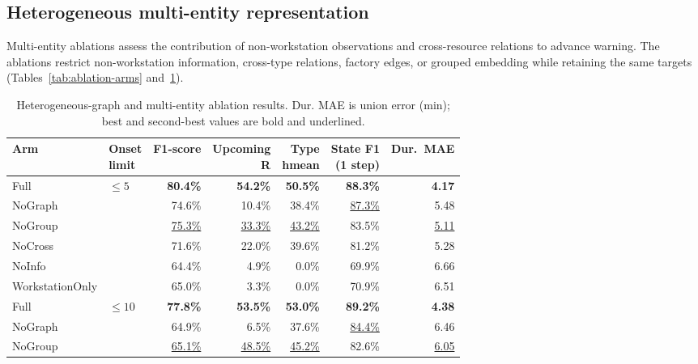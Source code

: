 \subsection{Heterogeneous multi-entity representation}\label{sec:entity-analysis}

Multi-entity ablations assess the contribution of non-workstation observations and cross-resource relations to advance warning. The ablations restrict non-workstation information, cross-type relations, factory edges, or grouped embedding while retaining the same targets (Tables~\ref{tab:ablation-arms} and~\ref{tab:entity-ablation-new}).

\begin{table}[!htbp]
\centering
\caption{Heterogeneous-graph and multi-entity ablation results. Dur. MAE is union error (min); best and second-best values are bold and underlined.}
\label{tab:entity-ablation-new}
\footnotesize
\setlength{\tabcolsep}{3.5pt}
\renewcommand{\arraystretch}{1.05}
\begin{fittable}
\begin{tabular*}{\linewidth}{@{\extracolsep{\fill}}llrrrrr@{}}
\toprule
Arm & \makecell{Onset\\limit} & F1-score & \makecell{Upcoming\\R} & \makecell{Type\\hmean} & \makecell{State F1\\(1 step)} & Dur.\ MAE \\
\midrule
Full & $\leq5$ & \textbf{80.4\%} & \textbf{54.2\%} & \textbf{50.5\%} & \textbf{88.3\%} & \textbf{4.17} \\
NoGraph &  & 74.6\% & 10.4\% & 38.4\% & \underline{87.3\%} & 5.48 \\
NoGroup &  & \underline{75.3\%} & \underline{33.3\%} & \underline{43.2\%} & 83.5\% & \underline{5.11} \\
NoCross &  & 71.6\% & 22.0\% & 39.6\% & 81.2\% & 5.28 \\
NoInfo &  & 64.4\% & 4.9\% & 0.0\% & 69.9\% & 6.66 \\
WorkstationOnly &  & 65.0\% & 3.3\% & 0.0\% & 70.9\% & 6.51 \\
\midrule
Full & $\leq10$ & \textbf{77.8\%} & \textbf{53.5\%} & \textbf{53.0\%} & \textbf{89.2\%} & \textbf{4.38} \\
NoGraph &  & 64.9\% & 6.5\% & 37.6\% & \underline{84.4\%} & 6.46 \\
NoGroup &  & \underline{65.1\%} & \underline{48.5\%} & \underline{45.2\%} & 82.6\% & \underline{6.05} \\

\end{tabular*}
\end{fittable}
\end{table}
